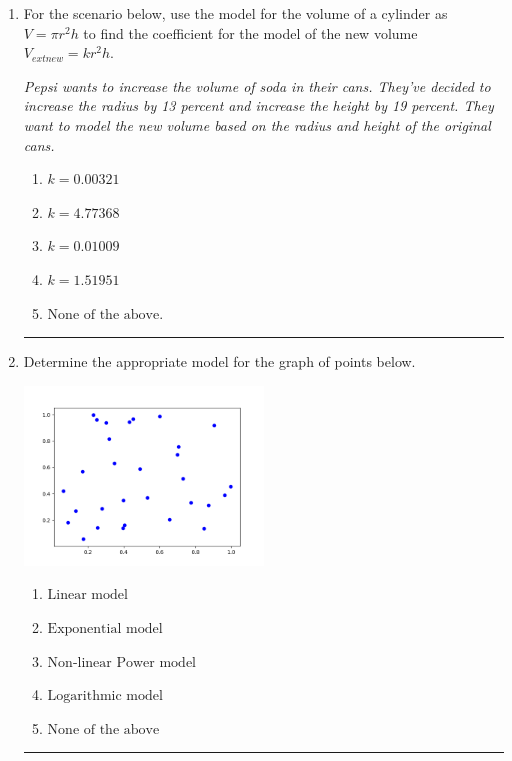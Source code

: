 \documentclass[14pt]{extbook}
\newcommand{\litem}[1]{\item#1\hspace*{-1cm}\rule{\textwidth}{0.4pt}}
\begin{document}
\begin{enumerate}
{\begin{enumerate}[label=\Alph*.]
\end{enumerate} }
\litem{
For the scenario below, use the model for the volume of a cylinder as $V = \pi r^2 h$ to find the coefficient for the model of the new volume $V_{	ext{new}} = k r^2 h$.
\begin{center}
    \textit{ Pepsi wants to increase the volume of soda in their cans. They've decided to increase the radius by 13 percent and increase the height by 19 percent. They want to model the new volume based on the radius and height of the original cans. }
\end{center}
\begin{enumerate}[label=\Alph*.]
\item \( k = 0.00321 \)
\item \( k = 4.77368 \)
\item \( k = 0.01009 \)
\item \( k = 1.51951 \)
\item \( \text{None of the above.} \)

\end{enumerate} }
\litem{
Determine the appropriate model for the graph of points below.
\begin{center}
    \includegraphics[width=0.5\textwidth]{../Figures/identifyModelGraph12A.png}
\end{center}
\begin{enumerate}[label=\Alph*.]
\item \( \text{Linear model} \)
\item \( \text{Exponential model} \)
\item \( \text{Non-linear Power model} \)
\item \( \text{Logarithmic model} \)
\item \( \text{None of the above} \)


\end{enumerate}}
\end{enumerate}
\end{document}
